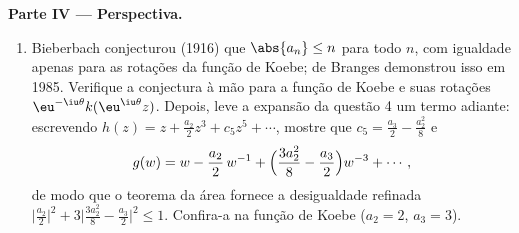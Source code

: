 \begin{problem}
\medskip
\noindent\textbf{Parte IV --- Perspectiva.}
\begin{enumerate}[resume]
  \item Bieberbach conjecturou (1916) que $\abs{a_n} \leq n$ para todo $n$, com
        igualdade apenas para as rotações da função de Koebe; de
        Branges demonstrou isso em 1985. Verifique a conjectura à mão
        para a função de Koebe e suas rotações $\eu^{-\iu\theta}k(\eu^{\iu\theta}z)$. Depois, leve a
        expansão da questão 4 um termo adiante: escrevendo $h(z) = z + \frac{a_2}2z^3 + c_5z^5 + \cdots$, mostre
        que $c_5 = \frac{a_3}2 - \frac{a_2^2}8$ e
        \[
        g(w) = w - \frac{a_2}{2}\,w^{-1} +
        \Bigl(\frac{3a_2^2}8 - \frac{a_3}2\Bigr)w^{-3} +
        \cdots ,
        \]
        de modo que o teorema da área fornece a desigualdade refinada
        $\bigl|\frac{a_2}2\bigr|^2 + 3\bigl|\frac{3a_2^2}8 -
        \frac{a_3}2\bigr|^2 \leq 1$. Confira-a na função de Koebe ($a_2 = 2$, $a_3 = 3$).
\end{enumerate}


\end{problem}
